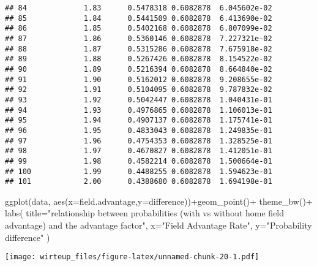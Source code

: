 \documentclass[
]{article}
\newenvironment{Shaded}{\begin{snugshade}}{\end{snugshade}}
\newcommand{\AttributeTok}[1]{\textcolor[rgb]{0.77,0.63,0.00}{#1}}
\newcommand{\FunctionTok}[1]{\textcolor[rgb]{0.00,0.00,0.00}{#1}}
\newcommand{\NormalTok}[1]{#1}
\newcommand{\SpecialCharTok}[1]{\textcolor[rgb]{0.00,0.00,0.00}{#1}}
\newcommand{\StringTok}[1]{\textcolor[rgb]{0.31,0.60,0.02}{#1}}
\begin{document}
\begin{verbatim}
## 84             1.83      0.5478318 0.6082878  6.045602e-02
## 85             1.84      0.5441509 0.6082878  6.413690e-02
## 86             1.85      0.5402168 0.6082878  6.807099e-02
## 87             1.86      0.5360146 0.6082878  7.227321e-02
## 88             1.87      0.5315286 0.6082878  7.675918e-02
## 89             1.88      0.5267426 0.6082878  8.154522e-02
## 90             1.89      0.5216394 0.6082878  8.664840e-02
## 91             1.90      0.5162012 0.6082878  9.208655e-02
## 92             1.91      0.5104095 0.6082878  9.787832e-02
## 93             1.92      0.5042447 0.6082878  1.040431e-01
## 94             1.93      0.4976865 0.6082878  1.106013e-01
## 95             1.94      0.4907137 0.6082878  1.175741e-01
## 96             1.95      0.4833043 0.6082878  1.249835e-01
## 97             1.96      0.4754353 0.6082878  1.328525e-01
## 98             1.97      0.4670827 0.6082878  1.412051e-01
## 99             1.98      0.4582214 0.6082878  1.500664e-01
## 100            1.99      0.4488255 0.6082878  1.594623e-01
## 101            2.00      0.4388680 0.6082878  1.694198e-01
\end{verbatim}

\begin{Shaded}
\begin{Highlighting}[]
\FunctionTok{ggplot}\NormalTok{(data, }\FunctionTok{aes}\NormalTok{(}\AttributeTok{x=}\NormalTok{field.advantage,}\AttributeTok{y=}\NormalTok{difference))}\SpecialCharTok{+}\FunctionTok{geom\_point}\NormalTok{()}\SpecialCharTok{+}
  \FunctionTok{theme\_bw}\NormalTok{()}\SpecialCharTok{+}
  \FunctionTok{labs}\NormalTok{(}
    \AttributeTok{title=}\StringTok{"relationship between probabilities (with vs without home field advantage) and the advantage factor"}\NormalTok{,}
    \AttributeTok{x=}\StringTok{"Field Advantage Rate"}\NormalTok{,}
    \AttributeTok{y=}\StringTok{"Probability difference"}
\NormalTok{  )}
\end{Highlighting}
\end{Shaded}

\texttt{[image: wirteup\_files/figure-latex/unnamed-chunk-20-1.pdf]}
\end{document}
